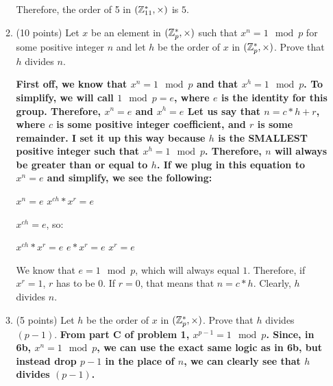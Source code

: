 \documentclass[11pt]{article}
\begin{document}
\begin{enumerate}
\begin{enumerate}
{      Therefore, the order of 5 in $({\mathbb Z}_{11}^*,\times)$ is $5$.
  }
    \vspace{0.09\textheight}
    \item (10 points) Let $x$ be an element in $({\mathbb Z}_p^*,\times)$ such that $x^n=1 \mod{p}$ for some positive integer $n$ and let $h$ be the order of $x$ in $({\mathbb Z}_p^*,\times)$. Prove that $h$ divides $n$.\newline
  {\bfseries
      \newline
      First off, we know that $x^n = 1\mod p$ and that $x^h = 1\mod p$. To simplify, we will call $1\mod p = e$, where $e$ is the identity for this group. Therefore, $x^n = e$ and $x^h = e$ \newline
      \newline
      Let us say that $n = c*h + r$, where $c$ is some positive integer coefficient, and $r$ is some remainder. I set it up this way because $h$ is the SMALLEST positive integer such that $x^h = 1\mod p$. Therefore, $n$ will always be greater than or equal to $h$. If we plug in this equation to $x^n = e$ and simplify, we see the following: \newline

      $x^n = e$ \newline
      $x^{ch}*x^r = e$ \newline

      $x^{ch} = e$, so: \newline

      $x^{ch}*x^r = e$ \newline
      $e*x^r = e$ \newline
      $x^r = e$ \newline
      \newline

      We know that $e = 1\mod p$, which will always equal $1$. Therefore, if $x^r = 1$, $r$ has to be $0$. If $r = 0$, that means that $n = c*h$. Clearly, $h$ divides $n$.
  }
    \vspace{0.5\textheight}
    \item (5 points) Let $h$ be the order of $x$ in $({\mathbb Z}_p^*,\times)$. Prove that $h$ divides $(p-1)$.\newline
  {\bfseries
      \newline
      \newline
      From part C of problem 1, $x^{p-1} = 1\mod p$. Since, in 6b, $x^n = 1\mod p$, we can use the exact same logic as in 6b, but instead drop $p-1$ in the place of $n$, we can clearly see that $h$ divides $(p-1)$.
  }
\end{enumerate}
\newpage


\end{enumerate}
\end{document}
